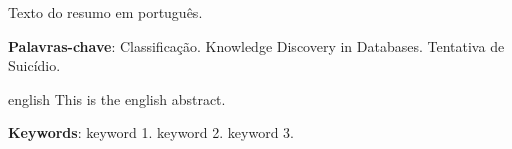 \setlength{\absparsep}{18pt} %
\begin{resumo}
 Texto do resumo em português.

 \textbf{Palavras-chave}: Classificação. Knowledge Discovery in Databases. Tentativa de Suicídio.
\end{resumo}

\begin{resumo}[Abstract]
 \begin{otherlanguage*}{english}
   This is the english abstract.

   \textbf{Keywords}: keyword 1. keyword 2. keyword 3.
 \end{otherlanguage*}
\end{resumo}